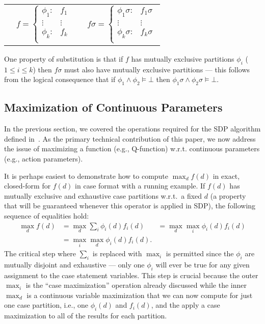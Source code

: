{\footnotesize
\begin{center}
\begin{tabular}{r c c l}
&
\hspace{-6mm} 
  $f = \begin{cases}
    \phi_1: & f_1 \\ 
   \vdots&\vdots\\ 
    \phi_k: & f_k \\ 
  \end{cases}$
&

&
\hspace{-2mm}
  $f\sigma = \begin{cases}
    \phi_1\sigma: & f_1\sigma \\ 
   \vdots&\vdots\\ 
    \phi_k\sigma: & f_k\sigma \\ 
  \end{cases}$
\end{tabular}
\end{center}
}
\normalsize

One property of substitution is that
if $f$ has mutually exclusive partitions $\phi_i$ ($1 \leq i \leq k$)
then $f\sigma$ must also have mutually exclusive partitions ---
this follows from the logical consequence that 
if $\phi_1 \land \phi_2 \models \bot$
then $\phi_1\sigma \land \phi_2\sigma \models \bot$.

\subsection{Maximization of Continuous Parameters}

In the previous section, we covered the operations required for the
SDP algorithm defined in~\cite{sanner_uai11}.  As the primary
technical contribution of this paper, we now address the
issue of maximizing a function (e.g., Q-function) w.r.t. continuous
parameters (e.g., action parameters).

It is perhaps easiest to demonstrate how to compute $\max_d f(d)$ in exact,
closed-form for $f(d)$ in case format with a running example.
If $f(d)$ has mutually exclusive and exhaustive 
case partitions w.r.t.\ a fixed $d$ (a property that will be guaranteed 
whenever this operator is applied in SDP), the following sequence of
equalities hold:
\begin{align*}
\max_d f(d) & = \max_d \sum_i \phi_i(d) f_i(d) & = \max_d \max_i \phi_i(d) f_i(d)\\
            & = \max_i \max_d \phi_i(d) f_i(d).
\end{align*}
The critical step where $\sum_i$ is replaced with $\max_i$ is permitted
since the $\phi_i$ are mutually disjoint and exhaustive --- only one $\phi_i$
will ever be true for any given assignment to the case statement variables.
This step is crucial because the outer $\max_i$ is the ``case maximization''
operation already discussed while the inner $\max_d$ is a continuous variable
maximization that we can now compute for just one case partition, i.e.,
one $\phi_i(d)$ and $f_i(d)$, and the apply a case maximization to all
of the results for each partition.

